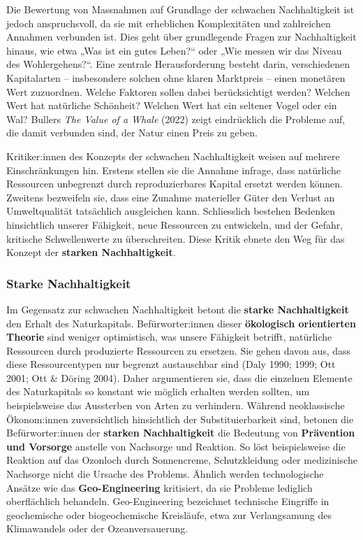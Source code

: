 \documentclass[
  letterpaper,
  DIV=11,
  numbers=noendperiod]{scrartcl}
\begin{document}
Die Bewertung von Massnahmen auf Grundlage der schwachen Nachhaltigkeit
ist jedoch anspruchsvoll, da sie mit erheblichen Komplexitäten und
zahlreichen Annahmen verbunden ist. Dies geht über grundlegende Fragen
zur Nachhaltigkeit hinaus, wie etwa „Was ist ein gutes Leben?{}`` oder
„Wie messen wir das Niveau des Wohlergehens?{}``. Eine zentrale
Herausforderung besteht darin, verschiedenen Kapitalarten --
insbesondere solchen ohne klaren Marktpreis -- einen monetären Wert
zuzuordnen. Welche Faktoren sollen dabei berücksichtigt werden? Welchen
Wert hat natürliche Schönheit? Welchen Wert hat ein seltener Vogel oder
ein Wal? Bullers \emph{The Value of a Whale} (2022) zeigt eindrücklich
die Probleme auf, die damit verbunden sind, der Natur einen Preis zu
geben.

Kritiker:innen des Konzepts der schwachen Nachhaltigkeit weisen auf
mehrere Einschränkungen hin. Erstens stellen sie die Annahme infrage,
dass natürliche Ressourcen unbegrenzt durch reproduzierbares Kapital
ersetzt werden können. Zweitens bezweifeln sie, dass eine Zunahme
materieller Güter den Verlust an Umweltqualität tatsächlich ausgleichen
kann. Schliesslich bestehen Bedenken hinsichtlich unserer Fähigkeit,
neue Ressourcen zu entwickeln, und der Gefahr, kritische Schwellenwerte
zu überschreiten. Diese Kritik ebnete den Weg für das Konzept der
\textbf{starken Nachhaltigkeit}.

\subsubsection{Starke Nachhaltigkeit}\label{starke-nachhaltigkeit}

Im Gegensatz zur schwachen Nachhaltigkeit betont die \textbf{starke
Nachhaltigkeit} den Erhalt des Naturkapitals. Befürworter:innen dieser
\textbf{ökologisch orientierten Theorie} sind weniger optimistisch, was
unsere Fähigkeit betrifft, natürliche Ressourcen durch produzierte
Ressourcen zu ersetzen. Sie gehen davon aus, dass diese Ressourcentypen
nur begrenzt austauschbar sind (Daly 1990; 1999; Ott 2001; Ott \& Döring
2004). Daher argumentieren sie, dass die einzelnen Elemente des
Naturkapitals so konstant wie möglich erhalten werden sollten, um
beispielsweise das Aussterben von Arten zu verhindern. Während
neoklassische Ökonom:innen zuversichtlich hinsichtlich der
Substituierbarkeit sind, betonen die Befürworter:innen der
\textbf{starken Nachhaltigkeit} die Bedeutung von \textbf{Prävention und
Vorsorge} anstelle von Nachsorge und Reaktion. So löst beispielsweise
die Reaktion auf das Ozonloch durch Sonnencreme, Schutzkleidung oder
medizinische Nachsorge nicht die Ursache des Problems. Ähnlich werden
technologische Ansätze wie das \textbf{Geo-Engineering} kritisiert, da
sie Probleme lediglich oberflächlich behandeln. Geo-Engineering
bezeichnet technische Eingriffe in geochemische oder biogeochemische
Kreisläufe, etwa zur Verlangsamung des Klimawandels oder der
Ozeanversauerung.
\end{document}
